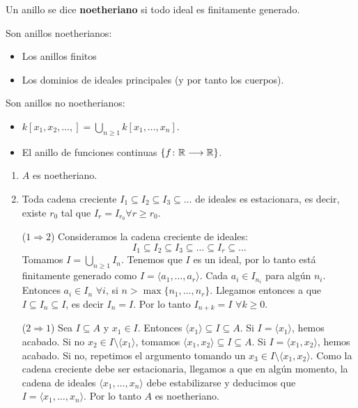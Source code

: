 \documentclass[ACGA.tex]{subfiles}
\begin{document}
\begin{defi}
Un anillo se dice \textbf{noetheriano} si todo ideal es finitamente generado.
\end{defi}
\begin{prop}
Son anillos noetherianos:
\begin{itemize}
\item Los anillos finitos
\item Los dominios de ideales principales (y por tanto los cuerpos).
\end{itemize}
\end{prop}
\begin{nota}
Son anillos no noetherianos:
\begin{itemize}
	\item $k[x_1,x_2,\dots,] = \bigcup_{n \geq 1} k[x_1,\dots,x_n]$.
	\item El anillo de funciones continuas $\{f \colon{\mathbb{R}}\longrightarrow{\mathbb{R}}\}$.
\end{itemize}
\end{nota}
\begin{prop}\mbox{}
\begin{enumerate}
	\item $A$ es noetheriano.
	\item Toda cadena creciente $I_1 \subseteq I_2 \subseteq I_3 \subseteq \dots$ de ideales es estacionara, es decir, existe $r_0$ tal que $I_r = I_{r_0} \forall r \geq r_0$.
\end{enumerate}
\end{prop}

\begin{dem}\mbox{}
\begin{itemize}
	\item[($1\Rightarrow 2$)]
	Consideramos la cadena creciente de ideales:
	\[ I_1 \subseteq I_2 \subseteq I_3 \subseteq \dots \subseteq I_r \subseteq \dots \]
	Tomamos $I = \bigcup_{n\geq 1} I_n$. Tenemos que $I$ es un ideal, por lo tanto está finitamente generado como $I = \langle a_1, \dots, a_r \rangle$. Cada $a_i \in I_{n_i}$ para algún $n_i$. Entonces $a_i \in I_n$  $\forall i$, si $n > \max\{n_1,\dots,n_r\}$. Llegamos entonces a que $I \subseteq I_n \subseteq I$, es decir $I_n = I$. Por lo tanto $I_{n+k} = I$ $\forall k \geq 0$. 

	\item[($2\Rightarrow 1$)]
	Sea $I \subseteq A$ y $x_1 \in I$. Entonces $\langle x_1 \rangle \subseteq I \subseteq A$. Si $I = \langle x_1 \rangle$, hemos acabado. Si no $x_2 \in I \setminus \langle x_1 \rangle$, tomamos $\langle x_1, x_2 \rangle \subseteq I \subseteq A$. Si $I = \langle x_1, x_2 \rangle$, hemos acabado. Si no, repetimos el argumento tomando un $x_3 \in I \setminus \langle x_1,x_2 \rangle$. Como la cadena creciente debe ser estacionaria, llegamos a que en algún momento, la cadena de ideales $\langle x_1,\dots,x_n\rangle$ debe estabilizarse y deducimos que $I = \langle x_1,\dots,x_n\rangle$. Por lo tanto $A$ es noetheriano. \QED

\end{itemize}
\end{dem}
\end{document}
